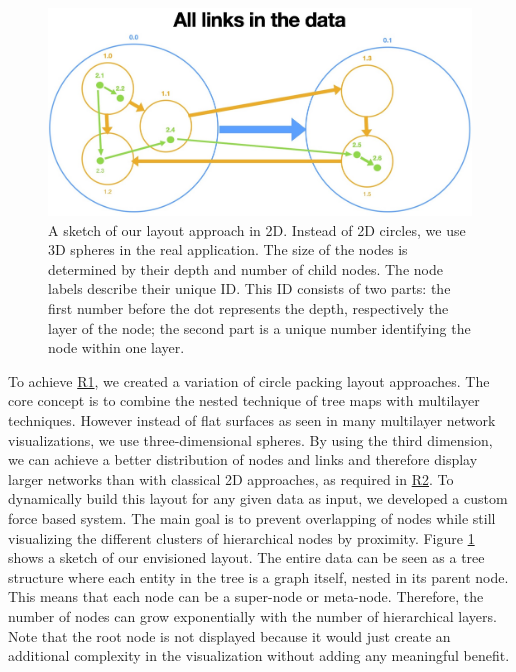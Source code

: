 \begin{figure}[h]
    \centering
    \includegraphics[width=\textwidth, trim={0cm 0cm 0cm 3.5cm},clip]{graphics/filterLinks/allLinks.jpg}
    \caption[A sketch of our layout in 2D.]{A sketch of our layout approach in 2D. Instead of 2D circles, we use 3D spheres in the real application. The size of the nodes is determined by their depth and number of child nodes. The node labels describe their unique ID. This ID consists of two parts: the first number before the dot represents the depth, respectively the layer of the node; the second part is a unique number identifying the node within one layer.} 
    \label{fig:layoutSketch} 
\end{figure}
To achieve \hyperref[req:R1]{R1}, we created a variation of circle packing layout approaches. The core concept is to combine the nested technique of tree maps with multilayer techniques. However instead of flat surfaces as seen in many multilayer network visualizations, we use three-dimensional spheres. 
By using the third dimension, we can achieve a better distribution of nodes and links and therefore display larger networks than with classical 2D approaches, as required in \hyperref[req:R2]{R2}. 
To dynamically build this layout for any given data as input, we developed a custom force based system.
The main goal is to prevent overlapping of nodes while still visualizing the different clusters of hierarchical nodes by proximity. Figure \ref{fig:layoutSketch} shows a sketch of our envisioned layout. The entire data can be seen as a tree structure where each entity in the tree is a graph itself, nested in its parent node. This means that each node can be a super-node or meta-node. Therefore, the number of nodes can grow exponentially with the number of hierarchical layers. Note that the root node is not displayed because it would just create an additional complexity in the visualization without adding any meaningful benefit.

